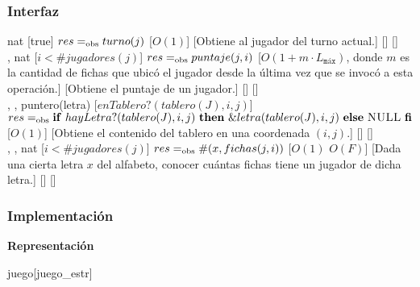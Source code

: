 \begin{interfaz}{\subsubsection{Interfaz}}
\begin{operaciones}
    \noindent{}
    {
    }{nat}
    [true]
    {$res=_{\mathrm{obs}} turno(j)$}
    [$O(1)$]
    [Obtiene al jugador del turno actual.]
    [\falta]
    [\falta]\\

    \noindent{}
    {
      ,
    }{nat}
    [$i < \#jugadores(j)$]
    {$res=_{\mathrm{obs}} puntaje(j,i)$}
    [$O(1+m\cdot L_{\texttt{máx}})$, donde $m$ es la cantidad de fichas que ubicó el
jugador desde la última vez que se invocó a esta operación.]
    [Obtiene el puntaje de un jugador.]
    [\falta]
    [\falta]\\

    \noindent{}
    {
      ,
      ,
    }{puntero(letra)}
    [$enTablero?(tablero(J),i,j)$]
    {$res\igobs\IFL{hayLetra?(tablero(J),i,j)}THEN{\&letra(tablero(J),i,j)}ELSE{\NULL}FI$}
    [$O(1)$]
    [Obtiene el contenido del tablero en una coordenada $(i,j)$.]
    [\falta]
    [\falta]\\

    \noindent{}
    {
      ,
      ,
    }{nat}
    [$i < \#jugadores(j)$]
    {$res=_{\mathrm{obs}} \#(x,fichas(j,i))$}
    [$O(1)$ \falta $O(F)$]
    [Dada una cierta letra $x$ del alfabeto, conocer cuántas fichas tiene un jugador de dicha letra.]
    [\falta]
    [\falta]\\

  \end{operaciones}
\end{interfaz}

\subsubsection{Implementación}
\textbf{Representación}
\begin{Estructura}{juego}[juego\_estr]
\begin{Tupla}
\begin{adjustwidth}{3em}{}\ \
  \\
  \\
  \tupItem{jugadorActual}{nat}\\
  \\
\end{adjustwidth}\ \ \ \ \ \ \
\end{Tupla}
\end{Estructura}


